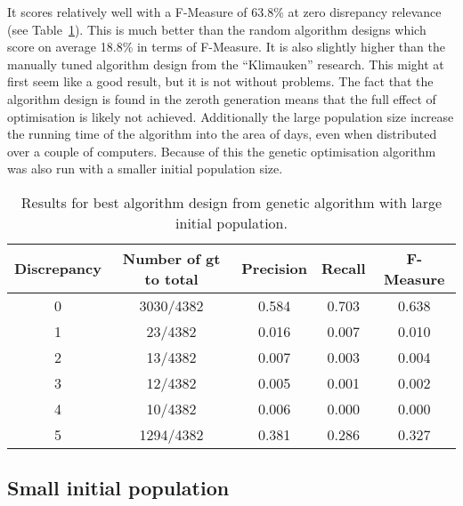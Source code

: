 It scores relatively well with a F-Measure of 63.8\% at zero disrepancy relevance (see Table~\ref{tab:geneticlargeparametersresults}). This is much better than the random algorithm designs which score on average 18.8\% in terms of F-Measure. It is also slightly higher than the manually tuned algorithm design from the ``Klimauken'' research. This might at first seem like a good result, but it is not without problems. The fact that the algorithm design is found in the zeroth generation means that the full effect of optimisation is likely not achieved. Additionally the large population size increase the running time of the algorithm into the area of days, even when distributed over a couple of computers. Because of this the genetic optimisation algorithm was also run with a smaller initial population size.

\begin{table}[H]
\begin{center}
\begin{tabular}{|c|c|ccc|}
\hline
Discrepancy & Number of gt to total & Precision & Recall & F-Measure\\ 
\hline
0&   3030/4382&   0.584&    0.703&    0.638\\ 
1&   23/4382&     0.016&    0.007&    0.010\\ 
2&   13/4382&     0.007&    0.003&    0.004\\ 
3&   12/4382&     0.005&    0.001&    0.002\\ 
4&   10/4382&     0.006&    0.000&    0.000\\ 
5&   1294/4382&   0.381&    0.286&    0.327\\
\hline
\end{tabular}
\end{center}
\caption{Results for best algorithm design from genetic algorithm with large initial population.}
\label{tab:geneticlargeparametersresults}
\end{table}


\subsection{Small initial population}

